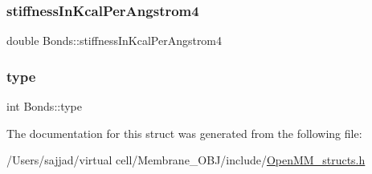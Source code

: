 \subsubsection{\texorpdfstring{stiffnessInKcalPerAngstrom4}{stiffnessInKcalPerAngstrom4}}
{\footnotesize\ttfamily double Bonds\+::stiffness\+In\+Kcal\+Per\+Angstrom4}

\mbox{\label{structBonds_a888b86b64e111ca2c1cdc57ab3f1e575}} 
\subsubsection{\texorpdfstring{type}{type}}
{\footnotesize\ttfamily int Bonds\+::type}



The documentation for this struct was generated from the following file\+:\begin{DoxyCompactItemize}
\item 
/\+Users/sajjad/virtual cell/\+Membrane\+\_\+\+O\+B\+J/include/\mbox{\hyperlink{OpenMM__structs_8h}{Open\+M\+M\+\_\+structs.\+h}}\end{DoxyCompactItemize}
